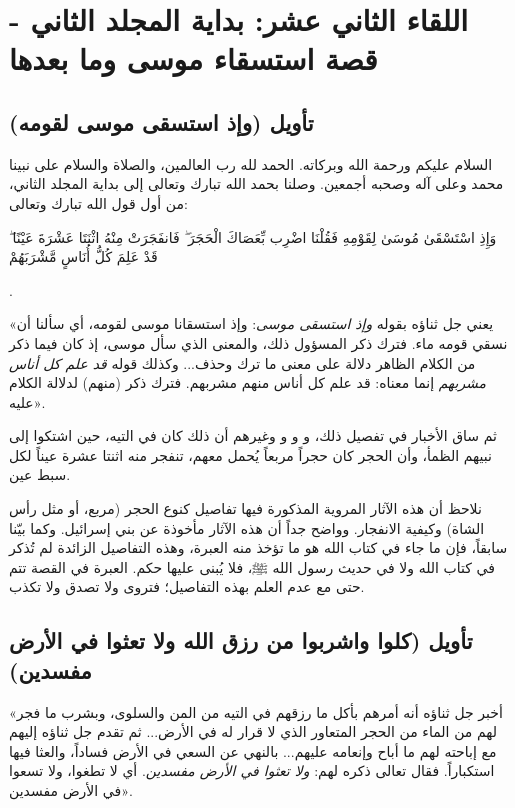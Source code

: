 \chapter{اللقاء الثاني عشر: بداية المجلد الثاني - قصة استسقاء موسى وما بعدها}

\section{تأويل (وإذ استسقى موسى لقومه)}
السلام عليكم ورحمة الله وبركاته. الحمد لله رب العالمين، والصلاة والسلام على نبينا محمد وعلى آله وصحبه أجمعين.
وصلنا بحمد الله تبارك وتعالى إلى بداية المجلد الثاني، من أول قول الله تبارك وتعالى: \begin{ayah}وَإِذِ اسْتَسْقَىٰ مُوسَىٰ لِقَوْمِهِ فَقُلْنَا اضْرِب بِّعَصَاكَ الْحَجَرَ ۖ فَانفَجَرَتْ مِنْهُ اثْنَتَا عَشْرَةَ عَيْنًا ۖ قَدْ عَلِمَ كُلُّ أُنَاسٍ مَّشْرَبَهُمْ\end{ayah}.

 «يعني جل ثناؤه بقوله \textit{وإذ استسقى موسى}: وإذ استسقانا موسى لقومه، أي سألنا أن نسقي قومه ماء. فترك ذكر المسؤول ذلك، والمعنى الذي سأل موسى، إذ كان فيما ذكر من الكلام الظاهر دلالة على معنى ما ترك وحذف... وكذلك قوله \textit{قد علم كل أناس مشربهم} إنما معناه: قد علم كل أناس منهم مشربهم. فترك ذكر (منهم) لدلالة الكلام عليه».

ثم ساق  الأخبار في تفصيل ذلك،   و و و وغيرهم أن ذلك كان في التيه، حين اشتكوا إلى نبيهم الظمأ، وأن الحجر كان حجراً مربعاً يُحمل معهم، تنفجر منه اثنتا عشرة عيناً لكل سبط عين.

\begin{fawaid}
نلاحظ أن هذه الآثار المروية المذكورة فيها تفاصيل كنوع الحجر (مربع، أو مثل رأس الشاة) وكيفية الانفجار. وواضح جداً أن هذه الآثار مأخوذة عن بني إسرائيل. وكما بيّنا سابقاً، فإن ما جاء في كتاب الله هو ما تؤخذ منه العبرة، وهذه التفاصيل الزائدة لم تُذكر في كتاب الله ولا في حديث رسول الله ﷺ، فلا يُبنى عليها حكم. العبرة في القصة تتم حتى مع عدم العلم بهذه التفاصيل؛ فتروى ولا تصدق ولا تكذب.
\end{fawaid}

\separator

\section{تأويل (كلوا واشربوا من رزق الله ولا تعثوا في الأرض مفسدين)}
 «أخبر جل ثناؤه أنه أمرهم بأكل ما رزقهم في التيه من المن والسلوى، وبشرب ما فجر لهم من الماء من الحجر المتعاور الذي لا قرار له في الأرض... ثم تقدم جل ثناؤه إليهم مع إباحته لهم ما أباح وإنعامه عليهم... بالنهي عن السعي في الأرض فساداً، والعثا فيها استكباراً. فقال تعالى ذكره لهم: \textit{ولا تعثوا في الأرض مفسدين}. أي لا تطغوا، ولا تسعوا في الأرض مفسدين».

